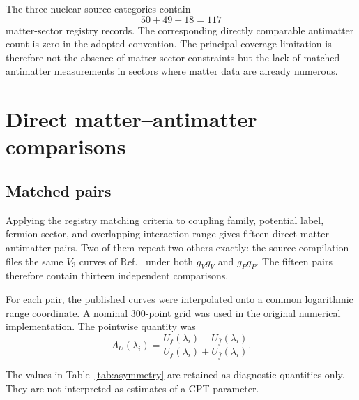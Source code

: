 \documentclass[aps,prd,reprint,superscriptaddress,nofootinbib]{revtex4-2}
\begin{document}
	The three nuclear-source categories contain
	\begin{equation}
		50+49+18=117
	\end{equation}
	matter-sector registry records. The corresponding directly comparable
	antimatter count is zero in the adopted convention. The principal
	coverage limitation is therefore not the absence of matter-sector
	constraints but the lack of matched antimatter measurements in sectors
	where matter data are already numerous.
	
	\section{Direct matter--antimatter comparisons}
	
	\subsection{Matched pairs}\label{sec:pairs}
	
	Applying the registry matching criteria to coupling family, potential
label, fermion sector, and overlapping interaction range gives fifteen
direct matter--antimatter pairs. Two of them repeat two others exactly:
the source compilation files the same $V_3$ curves of
Ref.~\cite{Fadeev2022} under both $g_Vg_V$ and $g_Pg_P$. The fifteen
pairs therefore contain thirteen independent comparisons.
	
	For each pair, the published curves were interpolated onto a common
	logarithmic range coordinate. A nominal 300-point grid was used in the
	original numerical implementation. The pointwise quantity was
	\begin{equation}
		A_U(\lambda_i)
		=
		\frac{
			U_f(\lambda_i)-U_{\bar f}(\lambda_i)
		}{
			U_f(\lambda_i)+U_{\bar f}(\lambda_i)
		}.
		\label{eq:AUlambda}
	\end{equation}
	
	The values in Table~\ref{tab:asymmetry} are retained as diagnostic
	quantities only. They are not interpreted as estimates of a CPT
	parameter.
	
\end{document}
